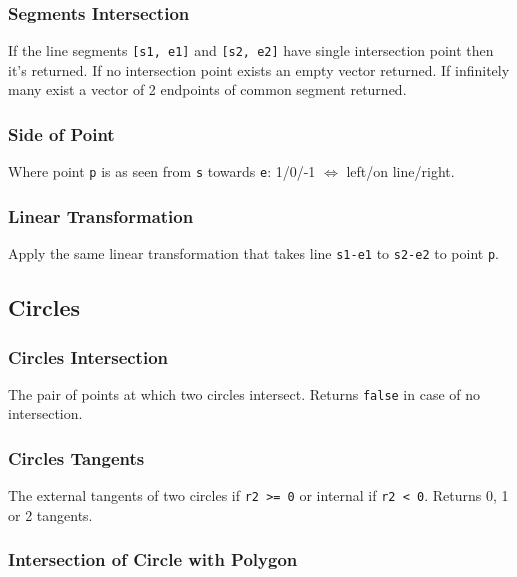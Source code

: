 \subsubsection{Segments Intersection}

If the line segments \verb|[s1, e1]| and \verb|[s2, e2]| have single intersection point then it's returned. If no intersection point exists an empty vector returned. If infinitely many exist a vector of 2 endpoints of common segment returned.

\subsubsection{Side of Point}

Where point \verb|p| is as seen from \verb|s| towards \verb|e|: 1/0/-1 $\iff$ left/on line/right.

\subsubsection{Linear Transformation}

Apply the same linear transformation that takes line \verb|s1-e1| to \verb|s2-e2| to point \verb|p|.

\subsection{Circles}

\subsubsection{Circles Intersection}

The pair of points at which two circles intersect. Returns \verb|false| in case of no intersection.

\subsubsection{Circles Tangents}

The external tangents of two circles if \verb|r2 >= 0| or internal if \verb|r2 < 0|. Returns 0, 1 or 2 tangents.

\subsubsection{Intersection of Circle with Polygon}

